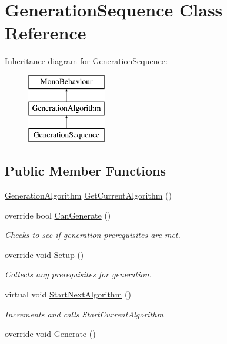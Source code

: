 \hypertarget{class_generation_sequence}{}\section{Generation\+Sequence Class Reference}
\label{class_generation_sequence}
Inheritance diagram for Generation\+Sequence\+:\begin{figure}[H]
\begin{center}
\leavevmode
\includegraphics[height=3.000000cm]{class_generation_sequence}
\end{center}
\end{figure}
\subsection*{Public Member Functions}
\begin{DoxyCompactItemize}
\item 
\mbox{\hyperlink{class_generation_algorithm}{Generation\+Algorithm}} \mbox{\hyperlink{class_generation_sequence_a09f98429afb3efcaa424397d45847132}{Get\+Current\+Algorithm}} ()
\item 
override bool \mbox{\hyperlink{class_generation_sequence_a33000b1383e18a453a592ed05a9e5e56}{Can\+Generate}} ()
\begin{DoxyCompactList}\small\item\em Checks to see if generation prerequisites are met. \end{DoxyCompactList}\item 
override void \mbox{\hyperlink{class_generation_sequence_ad433bd211eb9ed7e39d6e354c40289ff}{Setup}} ()
\begin{DoxyCompactList}\small\item\em Collects any prerequisites for generation. \end{DoxyCompactList}\item 
virtual void \mbox{\hyperlink{class_generation_sequence_afdce2edf1188afcaf018d67010c127c4}{Start\+Next\+Algorithm}} ()
\begin{DoxyCompactList}\small\item\em Increments  and calls Start\+Current\+Algorithm \end{DoxyCompactList}\item 
override void \mbox{\hyperlink{class_generation_sequence_ac594b809365f2af5e423bfd5830b796a}{Generate}} ()
\end{DoxyCompactItemize}
